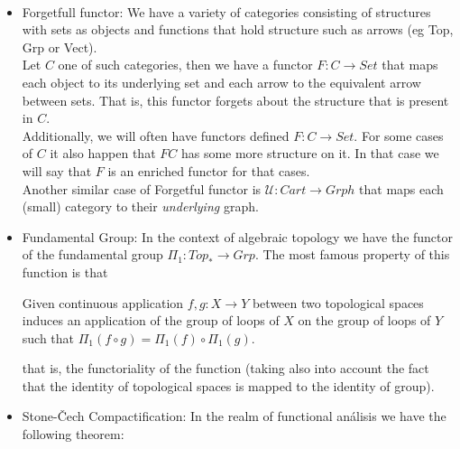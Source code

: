 \begin{example}\ 
  \begin{itemize}
  \item {Forgetfull functor}: We have a variety of categories consisting of structures with sets as objects and functions that hold structure such as arrows (eg Top, Grp or Vect).\\
    
    Let $C$ one of such  categories, then we have a functor $F:C\to Set$ that maps each object to its underlying set and each arrow to the equivalent arrow between sets. That is, this functor forgets about the structure that is present in $C$.\\

    Additionally, we will often have functors defined $F:C\to Set$. For some cases of $C$ it also happen that $FC$ has some more structure on it. In that case we will say that $F$ is an enriched functor for that cases.\\

    Another similar case of Forgetful functor is $\mathcal{U}:Cart \to Grph$ that maps each (small) category to their \emph{underlying} graph. 
  \item Fundamental Group: In the context of algebraic topology we have the functor of the fundamental group $\Pi_1: Top_* \to Grp$. The most famous property of this function is that

    
    \begin{displayquote}
      Given continuous application $ f,g:X \to Y$ between two topological spaces induces an application of the group of loops of $X$ on the group of loops of $Y$ such that $\Pi_1(f \circ g) = \Pi_1(f) \circ \Pi_1(g)$.
    \end{displayquote}

    that is, the functoriality of the function (taking also into account the fact that the identity of topological spaces is mapped to the identity of group). 

  \item Stone-\v{C}ech Compactification:  In the realm of functional análisis we have the following theorem:


\end{itemize}
\end{example}

